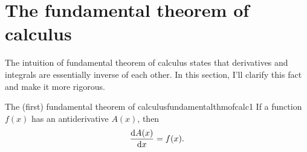\section{The fundamental theorem of calculus}
\label{sec:fundamentalthmofcalc}

The intuition of fundamental theorem of calculus states that derivatives and integrals are essentially inverse of each other. In this section, I'll clarify this fact and make it more rigorous.
\begin{theorem}{The (first) fundamental theorem of calculus}{fundamentalthmofcalc1}
    If a function $f(x)$ has an antiderivative $A(x)$, then
    \begin{equation}
        \odv{A(x)}{x} = f(x).
    \end{equation}
\end{theorem}

